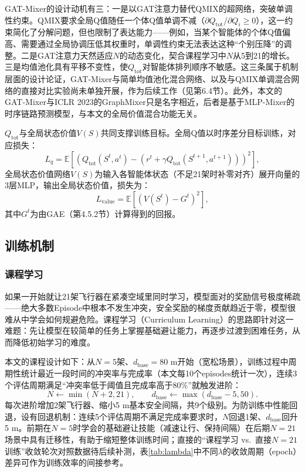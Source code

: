 \documentclass[12pt,a4paper,UTF8]{ctexart}
\begin{document}
GAT-Mixer的设计动机有三：一是以GAT注意力替代QMIX的超网络，突破单调性约束。QMIX要求全局Q值随任一个体Q值单调不减（$\partial Q_{\text{tot}}/\partial Q_i\geq0$），这一约束简化了分解问题，但也限制了表达能力——例如，当某个智能体的个体Q值偏高、需要通过全局协调压低其权重时，单调性约束无法表达这种“个别压降”的调整。二是GAT注意力天然适应$N$的动态变化，契合课程学习中$N$从5到21的增长。三是均值池化具有平移不变性，使$Q_{\text{tot}}$对智能体排列顺序不敏感。这三条属于机制层面的设计论证，GAT-Mixer与简单均值池化混合网络、以及与QMIX单调混合网络的直接对比实验尚未单独开展，作为后续工作（见第6.4节）。此外，本文的GAT-Mixer与ICLR 2023的GraphMixer\cite{ref28}只是名字相近，后者是基于MLP-Mixer的时序链路预测模型，与本文的全局价值混合功能无关。

$Q_{\text{tot}}$与全局状态价值$V(S)$共同支撑训练目标。全局Q值以时序差分目标训练，对应损失：
\begin{equation}
    L_{q} = \mathbb{E}\left[\left(Q_{\text{tot}}(S^t,a^t) - \left(r^t + \gamma Q_{\text{tot}}(S^{t+1},a^{t+1})\right)\right)^2\right],
    \label{eq:loss_q}
\end{equation}
全局状态价值网络$V(S)$为输入各智能体状态（不足21架时补零对齐）展开向量的3层MLP，输出全局状态价值，损失为：
\begin{equation}
    L_{\text{value}} = \mathbb{E}\left[\left(V(S^t) - G^t\right)^2\right],
    \label{eq:loss_value}
\end{equation}
其中$G^t$为由GAE（第4.5.2节）计算得到的回报。

\subsection{训练机制}

\subsubsection{课程学习}

如果一开始就让21架飞行器在紧凑空域里同时学习，模型面对的奖励信号极度稀疏——绝大多数Episode中根本不发生冲突，安全奖励的梯度贡献趋近于零，模型很难从中学会如何规避危险。课程学习（Curriculum Learning）\cite{ref39}的思路即针对这一难题：先让模型在较简单的任务上掌握基础避让能力，再逐步过渡到困难任务，从而降低初始学习的难度。

本文的课程设计如下：从$N=5$架、$d_{\text{base}}=80$ m开始（宽松场景），训练过程中周期性统计最近一段时间的冲突率与完成率（本文每10个episodes统计一次），连续3个评估周期满足“冲突率低于阈值且完成率高于80\%”就触发进阶：
\begin{equation}
    N \leftarrow \min(N+2, 21), \qquad d_{\text{base}} \leftarrow \max(d_{\text{base}}-5, 50).
    \label{eq:curriculum}
\end{equation}
每次进阶增加2架飞行器、缩小5 m基本安全间隔，共9个级别。为防训练中性能回退，设有回退机制：连续5个评估周期不满足完成率要求时，$N$回退1架、$d_{\text{base}}$回升5 m。前期在$N=5$时学会的基础避让技能（减速让行、保持间隔）在后期$N=21$场景中具有迁移性，有助于缩短整体训练时间；直接的“课程学习 vs.\ 直接$N=21$训练”收敛轮次对照数据待后续补测，表\ref{tab:lambda}中不同$\lambda$的收敛周期（epoch）差异可作为训练效率的间接参考。
\end{document}
